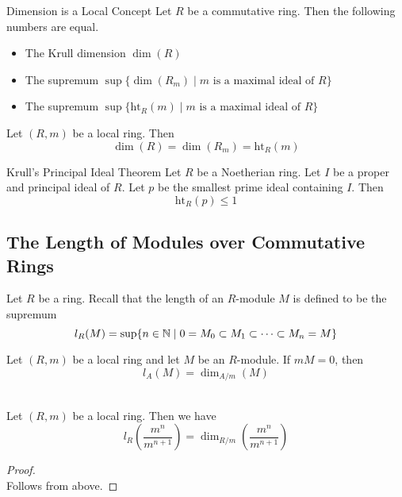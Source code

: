 \documentclass[a4paper]{article}
\begin{document}
\begin{prp}{Dimension is a Local Concept}{} Let $R$ be a commutative ring. Then the following numbers are equal. 
\begin{itemize}
\item The Krull dimension $\dim(R)$
\item The supremum $\sup\{\dim(R_m)\;|\;m\text{ is a maximal ideal of }R\}$
\item The supremum $\sup\{\text{ht}_R(m)\;|\;m\text{ is a maximal ideal of }R\}$
\end{itemize}
\end{prp}

\begin{crl}{}{} Let $(R,m)$ be a local ring. Then $$\dim(R)=\dim(R_m)=\text{ht}_R(m)$$
\end{crl}

\begin{thm}{Krull's Principal Ideal Theorem}{} Let $R$ be a Noetherian ring. Let $I$ be a proper and principal ideal of $R$. Let $p$ be the smallest prime ideal containing $I$. Then $$\text{ht}_R(p)\leq 1$$
\end{thm}

\subsection{The Length of Modules over Commutative Rings}
Let $R$ be a ring. Recall that the length of an $R$-module $M$ is defined to be the supremum $$l_R(M)=\text{sup}\{n\in\mathbb{N}\;|\;0=M_0\subset M_1\subset\cdots\subset M_n=M\}$$

\begin{lmm}{}{} Let $(R,m)$ be a local ring and let $M$ be an $R$-module. If $mM=0$, then $$l_A(M)=\dim_{A/m}(M)$$
\end{lmm}

\begin{eg}{}{}\\
Let $(R,m)$ be a local ring. Then we have $$l_R\left(\frac{m^n}{m^{n+1}}\right)=\dim_{R/m}\left(\frac{m^n}{m^{n+1}}\right)$$
\begin{proof}\\
Follows from above. 
\end{proof}
\end{eg}
\end{document}
